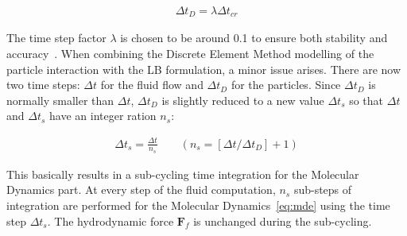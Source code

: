 \begin{align}
\Delta \mathit{t}_{D}=\lambda \Delta \mathit{t}_{cr}
\end{align}

The time step factor $\lambda$ is chosen to be around 0.1 to ensure both 
stability and accuracy~\citep{He1997}. When combining the Discrete Element 
Method 
modelling of the particle interaction with the LB formulation, a minor issue 
arises. There are now two time steps: $\Delta t$ for the fluid flow and $\Delta 
t_{D}$ for the particles. Since $\Delta t_{D}$ is normally smaller than $\Delta 
t$, $\Delta t_{D}$ is slightly reduced to a new value $\Delta t_{s}$ so that 
$\Delta t$ and $\Delta t_{s}$ have an integer ration $\mathit{n}_{\mathit{s}}$:

\begin{align}
\Delta t_{s}=\frac{\Delta t}{\mathit{n}_{s}} \qquad(\mathit{n}_{s}=[\Delta t/ 
\Delta t_{D}]+1)
\end{align} 

This basically results in a sub-cycling time integration for the Molecular 
Dynamics part. At every step of the fluid computation, $\mathit{n}_{s}$ 
sub-steps of integration are performed for the Molecular 
Dynamics~\eqref{eq:mde} using the time step $\Delta t_{s}$. The hydrodynamic 
force $\mathbf{F}_{f}$ is unchanged during the sub-cycling. 
